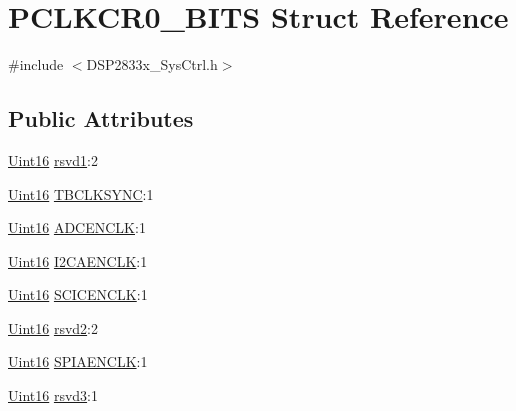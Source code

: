 \hypertarget{struct_p_c_l_k_c_r0___b_i_t_s}{}\section{P\+C\+L\+K\+C\+R0\+\_\+\+B\+I\+T\+S Struct Reference}
\label{struct_p_c_l_k_c_r0___b_i_t_s}


{\ttfamily \#include $<$D\+S\+P2833x\+\_\+\+Sys\+Ctrl.\+h$>$}

\subsection*{Public Attributes}
\begin{DoxyCompactItemize}
\item 
\hyperlink{_d_s_p2833x___device_8h_a59a9f6be4562c327cbfb4f7e8e18f08b}{Uint16} \hyperlink{struct_p_c_l_k_c_r0___b_i_t_s_a45d13c5879de46538bd777acaa92a6a3}{rsvd1}\+:2
\item 
\hyperlink{_d_s_p2833x___device_8h_a59a9f6be4562c327cbfb4f7e8e18f08b}{Uint16} \hyperlink{struct_p_c_l_k_c_r0___b_i_t_s_a28851e1f4a0d0fee2a1eb66fd339f75c}{T\+B\+C\+L\+K\+S\+Y\+N\+C}\+:1
\item 
\hyperlink{_d_s_p2833x___device_8h_a59a9f6be4562c327cbfb4f7e8e18f08b}{Uint16} \hyperlink{struct_p_c_l_k_c_r0___b_i_t_s_a2cc41a325b93fcd24cb6d87b92096fd5}{A\+D\+C\+E\+N\+C\+L\+K}\+:1
\item 
\hyperlink{_d_s_p2833x___device_8h_a59a9f6be4562c327cbfb4f7e8e18f08b}{Uint16} \hyperlink{struct_p_c_l_k_c_r0___b_i_t_s_ae4ff6ce1b2de2d2271a803afd4c84b2a}{I2\+C\+A\+E\+N\+C\+L\+K}\+:1
\item 
\hyperlink{_d_s_p2833x___device_8h_a59a9f6be4562c327cbfb4f7e8e18f08b}{Uint16} \hyperlink{struct_p_c_l_k_c_r0___b_i_t_s_a53bbbd55d88830fe2b199a3f8d383eb1}{S\+C\+I\+C\+E\+N\+C\+L\+K}\+:1
\item 
\hyperlink{_d_s_p2833x___device_8h_a59a9f6be4562c327cbfb4f7e8e18f08b}{Uint16} \hyperlink{struct_p_c_l_k_c_r0___b_i_t_s_a7810fcffba0116201bb7d6e478df0a01}{rsvd2}\+:2
\item 
\hyperlink{_d_s_p2833x___device_8h_a59a9f6be4562c327cbfb4f7e8e18f08b}{Uint16} \hyperlink{struct_p_c_l_k_c_r0___b_i_t_s_aedb843062f9bc78fc9f284b086d83074}{S\+P\+I\+A\+E\+N\+C\+L\+K}\+:1
\item 
\hyperlink{_d_s_p2833x___device_8h_a59a9f6be4562c327cbfb4f7e8e18f08b}{Uint16} \hyperlink{struct_p_c_l_k_c_r0___b_i_t_s_a103ca6993498d1e71cb72a109663cef1}{rsvd3}\+:1
\item 

\end{DoxyCompactItemize}
